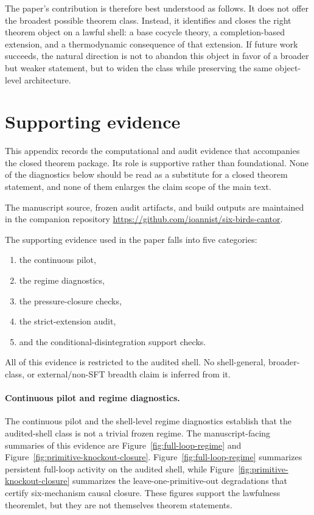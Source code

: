 \documentclass[11pt]{article}
\theoremstyle{definition}
\begin{document}
The paper’s contribution is therefore best understood as follows. It does not offer the broadest possible theorem class. Instead, it identifies and closes the right theorem object on a lawful shell: a base cocycle theory, a completion-based extension, and a thermodynamic consequence of that extension. If future work succeeds, the natural direction is not to abandon this object in favor of a broader but weaker statement, but to widen the class while preserving the same object-level architecture.
 
\appendix
\section{Supporting evidence}\label{sec:appendix-supporting-evidence}

This appendix records the computational and audit evidence that accompanies the closed theorem package. Its role is supportive rather than foundational. None of the diagnostics below should be read as a substitute for a closed theorem statement, and none of them enlarges the claim scope of the main text.

The manuscript source, frozen audit artifacts, and build outputs are maintained in the companion repository \url{https://github.com/ioannist/six-birds-cantor}.

The supporting evidence used in the paper falls into five categories:
\begin{enumerate}
    \item the continuous pilot,
    \item the regime diagnostics,
    \item the pressure-closure checks,
    \item the strict-extension audit,
    \item and the conditional-disintegration support checks.
\end{enumerate}
All of this evidence is restricted to the audited shell. No shell-general, broader-class, or external/non-SFT breadth claim is inferred from it.

\paragraph{Continuous pilot and regime diagnostics.}
The continuous pilot and the shell-level regime diagnostics establish that the audited-shell class is not a trivial frozen regime. The manuscript-facing summaries of this evidence are Figure~\ref{fig:full-loop-regime} and Figure~\ref{fig:primitive-knockout-closure}. Figure~\ref{fig:full-loop-regime} summarizes persistent full-loop activity on the audited shell, while Figure~\ref{fig:primitive-knockout-closure} summarizes the leave-one-primitive-out degradations that certify six-mechanism causal closure. These figures support the lawfulness theoremlet, but they are not themselves theorem statements.
\end{document}
